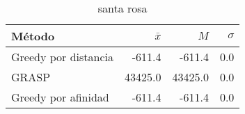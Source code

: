 \begin{table}[h!]
\centering
\begin{tabular}{|l|r|r|r|}
\hline
              Método &  $\bar{x}$ &     $M$ &  $\sigma$ \\
\hline
Greedy por distancia &     -611.4 &  -611.4 &       0.0 \\
               GRASP &    43425.0 & 43425.0 &       0.0 \\
 Greedy por afinidad &     -611.4 &  -611.4 &       0.0 \\
\hline
\end{tabular}
\caption{santa rosa}
\label{santa_rosa}
\end{table}

